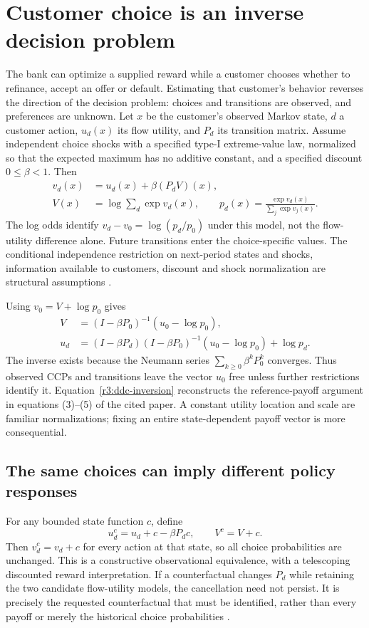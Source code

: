 \section{Customer choice is an inverse decision problem}
\label{r3:customer-choice}
The bank can optimize a supplied reward while a customer chooses
whether to refinance, accept an offer or default. Estimating that
customer's behavior reverses the direction of the decision problem:
choices and transitions are observed, and preferences are unknown.
Let $x$ be the customer's observed Markov state, $d$ a customer
action, $u_d(x)$ its flow utility, and $P_d$ its transition matrix.
Assume independent choice shocks with a specified type-I extreme-value
law, normalized so that the expected maximum has no additive constant,
and a specified discount $0\le\beta<1$. Then
\begin{align}
 v_d(x)&=u_d(x)+\beta(P_dV)(x),\nonumber\\
 V(x)&=\log\sum_d\exp v_d(x),\qquad
 p_d(x)=\frac{\exp v_d(x)}{\sum_j\exp v_j(x)}.
 \label{r3:ddc-logit}
\end{align}
The log odds identify $v_d-v_0=\log(p_d/p_0)$ under this model,
not the flow-utility difference alone. Future transitions enter the
choice-specific values. The conditional independence restriction on
next-period states and shocks, information available to customers,
discount and shock normalization are structural assumptions
\citep[Section 2]{kalouptsidi2021}.

Using $v_0=V+\log p_0$ gives
\begin{align}
 V&=(I-\beta P_0)^{-1}(u_0-\log p_0),\nonumber\\
 u_d&=(I-\beta P_d)(I-\beta P_0)^{-1}(u_0-\log p_0)+\log p_d.
 \label{r3:ddc-inversion}
\end{align}
The inverse exists because the Neumann series
$\sum_{k\ge0}\beta^kP_0^k$ converges. Thus observed CCPs and
transitions leave the vector $u_0$ free unless further restrictions
identify it. Equation~\eqref{r3:ddc-inversion} reconstructs the
reference-payoff argument in equations (3)--(5) of the cited paper.
A constant utility location and scale are familiar normalizations;
fixing an entire state-dependent payoff vector is more consequential.

\subsection{The same choices can imply different policy responses}
For any bounded state function $c$, define
\begin{equation}
 u_d^c=u_d+c-\beta P_dc,\qquad V^c=V+c.
 \label{r3:utility-equivalence}
\end{equation}
Then $v_d^c=v_d+c$ for every action at that state, so all choice
probabilities are unchanged. This is a constructive observational
equivalence, with a telescoping discounted reward interpretation.
If a counterfactual changes $P_d$ while retaining the two candidate
flow-utility models, the cancellation need not persist. It is precisely
the requested counterfactual that must be identified, rather than every
payoff or merely the historical choice probabilities
\citep{kalouptsidi2021}.

